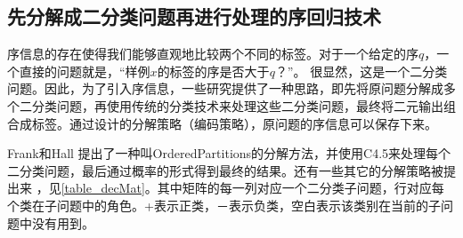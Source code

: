 \subsection{先分解成二分类问题再进行处理的序回归技术}
序信息的存在使得我们能够直观地比较两个不同的标签。对于一个给定的序\(q\)，一个直接的问题就是，“样例\(x\)的标签的序是否大于\(q\)？”\citep{lin2012reduction}。
很显然，这是一个二分类问题。因此，为了引入序信息，一些研究提供了一种思路，即先将原问题分解成多个二分类问题，再使用传统的分类技术来处理这些二分类问题，最终将二元输出组合成标签。通过设计的分解策略（编码策略），原问题的序信息可以保存下来。

Frank和Hall\citep{frank2001simple}
提出了一种叫OrderedPartitions的分解方法，并使用C4.5来处理每个二分类问题，最后通过概率的形式得到最终的结果。还有一些其它的分解策略被提出来\citep{kwon1997ordinal}
，见\autoref{table_decMat}。其中矩阵的每一列对应一个二分类子问题，行对应每个类在子问题中的角色。+表示正类，－表示负类，空白表示该类别在当前的子问题中没有用到。

